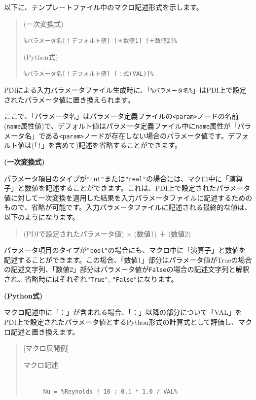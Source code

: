 \documentclass[a4paper,11pt]{jarticle}
\begin{document}
{以下に、テンプレートファイル中のマクロ記述形式を示します。

\begin{quote}
(一次変換式)

{\tt \%パラメータ名[！デフォルト値] [＊数値1] [＋数値2]\%}

\medskip
(Python式)

{\tt \%パラメータ名[！デフォルト値] [：式(VAL)]\%}
\end{quote}

PDIによる入力パラメータファイル生成時に、「{\tt \%パラメータ名\%}」はPDI上で設定されたパラメータ値に置き換えられます。

ここで、「パラメータ名」はパラメータ定義ファイルの\texttt{<param>}ノードの名前({\tt name}属性値)で、デフォルト値はパラメータ定義ファイル中に{\tt name}属性が「パラメータ名」である\texttt{<param>}ノードが存在しない場合のパラメータ値です。デフォルト値は(「{\tt !}」を含めて)記述を省略することができます。

\medskip
{\bf (一次変換式)}

パラメータ項目のタイプが\texttt{"int"}または\texttt{"real"}の場合には、マクロ中に「演算子」と数値を記述することができます。これは、PDI上で設定されたパラメータ値に対して一次変換を適用した結果を入力パラメータファイルに記述するためのもので、省略が可能です。入力パラメータファイルに記述される最終的な値は、以下のようになります。

\begin{quote}
(PDIで設定されたパラメータ値) × (数値1) ＋ (数値2)
\end{quote}

パラメータ項目のタイプが\texttt{"bool"}の場合にも、マクロ中に「演算子」と数値を記述することができます。この場合、「数値1」部分はパラメータ値がTrueの場合の記述文字列、「数値2」部分はパラメータ値が{\tt False}の場合の記述文字列と解釈され、省略時にはそれぞれ\texttt{"True"}, \texttt{"False"}になります。

\medskip
{\bf (Python式)}

マクロ記述中に「：」が含まれる場合、「：」以降の部分について「VAL」をPDI上で設定されたパラメータ値とするPython形式の計算式として評価し、マクロ記述と置き換えます。

\begin{quote}
[マクロ展開例]

\begin{description}
\item[マクロ記述] {\ }\\
{\tt Nu = \%Reynolds ! 10 : 0.1 * 1.0 / VAL\%}


\end{description}
\end{quote}}
\end{document}
